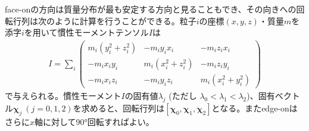face-onの方向は質量分布が最も安定する方向と見ることもでき、その向きへの回転行列は次のように計算を行うことができる。粒子$i$の座標$(x,y,z)$・質量$m$を添字$i$を用いて慣性モーメントテンソル$I$は
\begin{align}
	I = \sum_{i} \begin{pmatrix}
		m_i (y_i^2 + z_i^2) & -m_iy_ix_i & -m_iz_ix_i \\
		-m_i x_i y_i & m_i (x_i^2 + z_i^2) & -m_i z_iy_i \\
		-m_i x_i z_i & -m_i y_i z_i & m_i (x_i^2 + y_i^2)
	\end{pmatrix}
\end{align}
で与えられる。慣性モーメント$I$の固有値$\lambda_j$ (ただし $\lambda_0 < \lambda_1 < \lambda_2$)、固有ベクトル$\bm{\chi}_j \ (j = 0,1,2)$を求めると、回転行列は$[ \bm{\chi}_0, \bm{\chi}_1, \bm{\chi}_2 ]$となる。またedge-onはさらに$x$軸に対して$\ang{90}$回転すればよい。